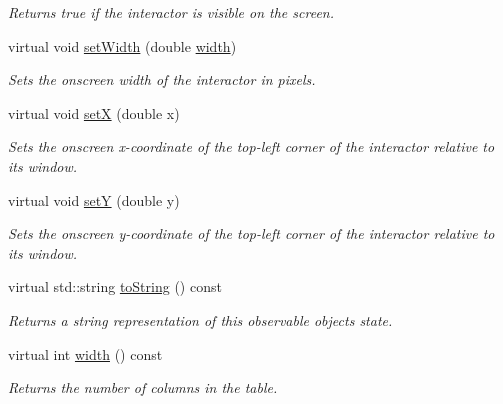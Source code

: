 \begin{DoxyCompactItemize}
\begin{DoxyCompactList}\small\item\em Returns true if the interactor is visible on the screen. \end{DoxyCompactList}\item 
virtual void \mbox{\hyperlink{classsgl_1_1GInteractor_aa3f3fba4cb131baa8696ba01e3bceca1}{set\+Width}} (double \mbox{\hyperlink{classsgl_1_1GTable_ad72663daf610f2a0833a2fc3d78e4fdf}{width}})
\begin{DoxyCompactList}\small\item\em Sets the onscreen width of the interactor in pixels. \end{DoxyCompactList}\item 
virtual void \mbox{\hyperlink{classsgl_1_1GInteractor_a9c18fcc579333bf9653d13ad2b372e39}{setX}} (double x)
\begin{DoxyCompactList}\small\item\em Sets the onscreen x-\/coordinate of the top-\/left corner of the interactor relative to its window. \end{DoxyCompactList}\item 
virtual void \mbox{\hyperlink{classsgl_1_1GInteractor_a7d57e2a5c35d27feb58fd498a3cf82b9}{setY}} (double y)
\begin{DoxyCompactList}\small\item\em Sets the onscreen y-\/coordinate of the top-\/left corner of the interactor relative to its window. \end{DoxyCompactList}\item 
virtual std\+::string \mbox{\hyperlink{classsgl_1_1GObservable_a1fe5121d6528fdea3f243321b3fa3a49}{to\+String}} () const
\begin{DoxyCompactList}\small\item\em Returns a string representation of this observable object\textquotesingle{}s state. \end{DoxyCompactList}\item 
virtual int \mbox{\hyperlink{classsgl_1_1GTable_ad72663daf610f2a0833a2fc3d78e4fdf}{width}} () const
\begin{DoxyCompactList}\small\item\em Returns the number of columns in the table. \end{DoxyCompactList}\end{DoxyCompactItemize}
